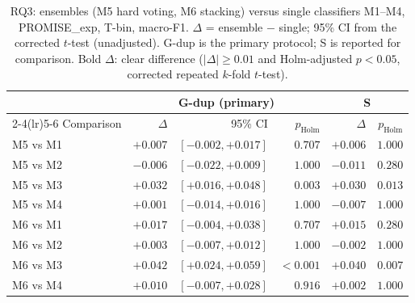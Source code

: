 \begin{table}[t]
\centering
\caption{RQ3: ensembles (M5 hard voting, M6 stacking) versus single classifiers M1--M4, PROMISE\_exp, T-bin, macro-F1. $\Delta$ = ensemble $-$ single; 95\% CI from the corrected $t$-test (unadjusted). G-dup is the primary protocol; S is reported for comparison. Bold $\Delta$: clear difference ($|\Delta| \geq 0.01$ and Holm-adjusted $p < 0.05$, corrected repeated $k$-fold $t$-test).}
\label{tab:rq3}
\footnotesize
\setlength{\tabcolsep}{3pt}
\begin{tabular}{lrrrrr}
\toprule
& \multicolumn{3}{c}{G-dup (primary)} & \multicolumn{2}{c}{S} \\
\cmidrule(lr){2-4}\cmidrule(lr){5-6}
Comparison & $\Delta$ & 95\% CI & $p_{\mathrm{Holm}}$ & $\Delta$ & $p_{\mathrm{Holm}}$ \\
\midrule
M5 vs M1 & $+0.007$ & $[-0.002, +0.017]$ & $0.707$ & $+0.006$ & $1.000$ \\
M5 vs M2 & $-0.006$ & $[-0.022, +0.009]$ & $1.000$ & $-0.011$ & $0.280$ \\
M5 vs M3 & $\mathbf{+0.032}$ & $[+0.016, +0.048]$ & $0.003$ & $\mathbf{+0.030}$ & $0.013$ \\
M5 vs M4 & $+0.001$ & $[-0.014, +0.016]$ & $1.000$ & $-0.007$ & $1.000$ \\
M6 vs M1 & $+0.017$ & $[-0.004, +0.038]$ & $0.707$ & $+0.015$ & $0.280$ \\
M6 vs M2 & $+0.003$ & $[-0.007, +0.012]$ & $1.000$ & $-0.002$ & $1.000$ \\
M6 vs M3 & $\mathbf{+0.042}$ & $[+0.024, +0.059]$ & $<0.001$ & $\mathbf{+0.040}$ & $0.007$ \\
M6 vs M4 & $+0.010$ & $[-0.007, +0.028]$ & $0.916$ & $+0.002$ & $1.000$ \\
\bottomrule
\end{tabular}
\end{table}
